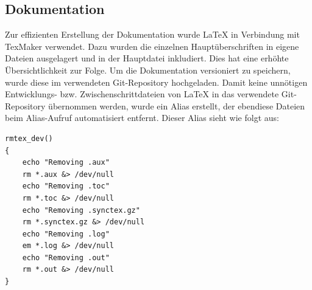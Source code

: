 \subsection{Dokumentation}
Zur effizienten Erstellung der Dokumentation wurde \LaTeX \(\) in Verbindung mit TexMaker verwendet. Dazu wurden die einzelnen Hauptüberschriften in eigene Dateien ausgelagert und in der Hauptdatei inkludiert. Dies hat eine erhöhte Übersichtlichkeit zur Folge.
Um die Dokumentation versioniert zu speichern, wurde diese im verwendeten Git-Repository hochgeladen. Damit keine unnötigen Entwicklungs- bzw. Zwischenschrittdateien von \LaTeX \(\) in das verwendete Git-Repository übernommen werden, wurde ein Alias erstellt, der ebendiese Dateien beim Alias-Aufruf automatisiert entfernt. Dieser Alias sieht wie folgt aus:

\begin{lstlisting}[frame=single]
rmtex_dev()
{
	echo "Removing .aux"
	rm *.aux &> /dev/null
	echo "Removing .toc"
	rm *.toc &> /dev/null
	echo "Removing .synctex.gz"
	rm *.synctex.gz &> /dev/null
	echo "Removing .log"
	em *.log &> /dev/null
	echo "Removing .out"
	rm *.out &> /dev/null
}
\end{lstlisting}